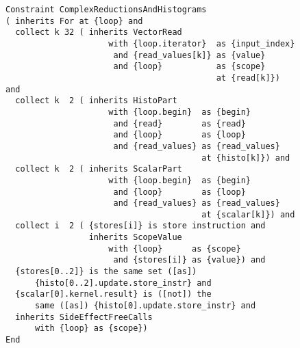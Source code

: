 \begin{figure}[h]
\begin{lstlisting}[language=IDL,basicstyle=\linespread{0.8}\ttfamily,
                   captionpos=t,caption=
   {Constraint specification of Complex Reduction and Histogram Computations in
    IDL
    \parfillskip=0pt}]
Constraint ComplexReductionsAndHistograms
( inherits For at {loop} and
  collect k 32 ( inherits VectorRead
                     with {loop.iterator}  as {input_index}
                      and {read_values[k]} as {value}
                      and {loop}           as {scope}
                                           at {read[k]}) and
  collect k  2 ( inherits HistoPart
                     with {loop.begin}  as {begin}
                      and {read}        as {read}
                      and {loop}        as {loop}
                      and {read_values} as {read_values}
                                        at {histo[k]}) and
  collect k  2 ( inherits ScalarPart
                     with {loop.begin}  as {begin}
                      and {loop}        as {loop}
                      and {read_values} as {read_values}
                                        at {scalar[k]}) and
  collect i  2 ( {stores[i]} is store instruction and
                 inherits ScopeValue
                     with {loop}      as {scope}
                      and {stores[i]} as {value}) and
  {stores[0..2]} is the same set ([as])
      {histo[0..2].update.store_instr} and
  {scalar[0].kernel.result} is ([not]) the
      same ([as]) {histo[0].update.store_instr} and
  inherits SideEffectFreeCalls
      with {loop} as {scope})
End
\end{lstlisting}
\end{figure}
